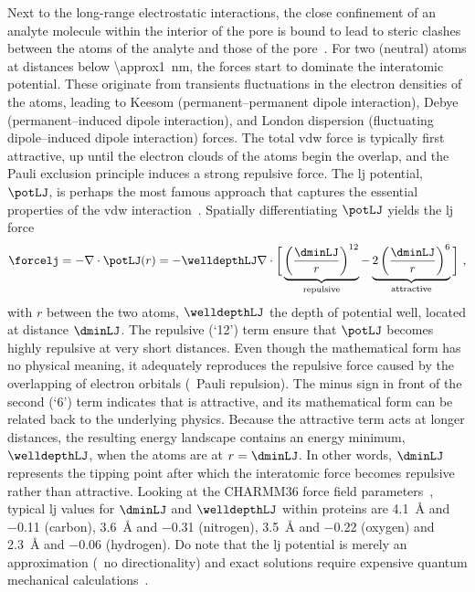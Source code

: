 Next to the long-range electrostatic interactions, the close confinement of an analyte molecule within the
interior of the pore is bound to lead to steric clashes between the atoms of the analyte and those of the
pore~\cite{Buchsbaum-2013}. For two (neutral) atoms at distances below \SI{\approx1}{\nm}, the 
forces start to dominate the interatomic potential. These originate from transients fluctuations in the
electron densities of the atoms, leading to Keesom (permanent--permanent dipole interaction), Debye
(permanent--induced dipole interaction), and London dispersion (fluctuating dipole--induced dipole
interaction) forces. The total \gls{vdw} force is typically first attractive, up until the electron clouds of
the atoms begin the overlap, and the Pauli exclusion principle induces a strong repulsive force. The \gls{lj}
potential, $\potLJ$, is perhaps the most famous approach that captures the essential properties of the
\gls{vdw} interaction~\cite{Paquet-2015}. Spatially differentiating $\potLJ$ yields the \gls{lj} force 
%
\begin{equation}
  \forcelj = - \nabla \cdot \potLJ( r ) = - \welldepthLJ \nabla \cdot \bigg[ 
    \underbrace{ \left( \dfrac{ \dminLJ }{ r } \right)^{12} }_{\text{repulsive}}
    -
    \underbrace{ 2 \left( \dfrac{ \dminLJ }{ r } \right)^{6} }_{\text{attractive}}
  \bigg]
  \text{ ,}
\end{equation}
% 
with $r$ between the two atoms, $\welldepthLJ$ the depth of potential well, located at distance $\dminLJ$. The
repulsive (`12') term ensure that $\potLJ$ becomes highly repulsive at very short distances. Even though the
mathematical form has no physical meaning, it adequately reproduces the repulsive force caused by the
overlapping of electron orbitals (\ie~Pauli repulsion). The minus sign in front of the second (`6') term
indicates that is attractive, and its mathematical form can be related back to the underlying physics. Because
the attractive term acts at longer distances, the resulting energy landscape contains an energy minimum,
$\welldepthLJ$, when the atoms are at $r = \dminLJ$. In other words, $\dminLJ$ represents the tipping point
after which the interatomic force becomes repulsive rather than attractive. Looking at the {CHARMM36} force
field parameters~\cite{Huang-2016}, typical \gls{lj} values for $\dminLJ$ and $\welldepthLJ$ within proteins
are \SI{4.1}{\angstrom} and \SI{-0.11}{\kbt} (carbon), \SI{3.6}{\angstrom} and \SI{-0.31}{\kbt} (nitrogen),
\SI{3.5}{\angstrom} and \SI{-0.22}{\kbt} (oxygen) and \SI{2.3}{\angstrom} and \SI{-0.06}{\kbt} (hydrogen). Do
note that the \gls{lj} potential is merely an approximation (\eg~no directionality) and exact solutions
require expensive quantum mechanical calculations~\cite{Paquet-2015}.

